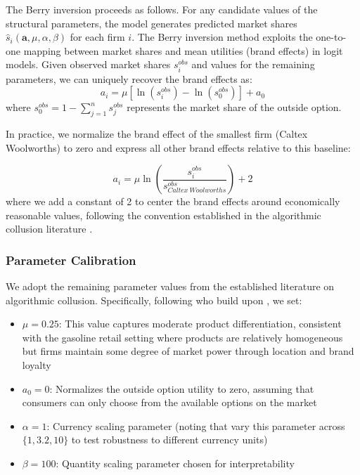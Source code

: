 The Berry inversion proceeds as follows. For any candidate values of the structural parameters, the model generates predicted market shares $\hat{s}_i(\boldsymbol{a}, \mu, \alpha, \beta)$ for each firm $i$. The Berry inversion method exploits the one-to-one mapping between market shares and mean utilities (brand effects) in logit models. Given observed market shares $s_i^{obs}$ and values for the remaining parameters, we can uniquely recover the brand effects as:
\begin{equation}
    a_i = \mu \left[ \ln(s_i^{obs}) - \ln(s_0^{obs}) \right] + a_0
\end{equation}
where $s_0^{obs} = 1 - \sum_{j=1}^{n} s_j^{obs}$ represents the market share of the outside option.

In practice, we normalize the brand effect of the smallest firm (Caltex Woolworths) to zero and express all other brand effects relative to this baseline:

\begin{equation}
    a_i = \mu \ln\left(\frac{s_i^{obs}}{s_{Caltex\ Woolworths}^{obs}}\right) + 2
\end{equation}
where we add a constant of 2 to center the brand effects around economically reasonable values, following the convention established in the algorithmic collusion literature \parencite{fish_algorithmic_2025}.

\subsubsection*{Parameter Calibration}

We adopt the remaining parameter values from the established literature on algorithmic collusion. Specifically, following \textcite{fish_algorithmic_2025} who build upon \textcite{calvano_artificial_2020}, we set:

\begin{itemize}
    \item $\mu = 0.25$: This value captures moderate product differentiation, consistent with the gasoline retail setting where products are relatively homogeneous but firms maintain some degree of market power through location and brand loyalty
    \item $a_0 = 0$: Normalizes the outside option utility to zero, assuming that consumers can only choose from the available options on the market
    \item $\alpha = 1$: Currency scaling parameter (noting that \textcite{fish_algorithmic_2025} vary this parameter across $\{1, 3.2, 10\}$ to test robustness to different currency units)
    \item $\beta = 100$: Quantity scaling parameter chosen for interpretability
\end{itemize}

